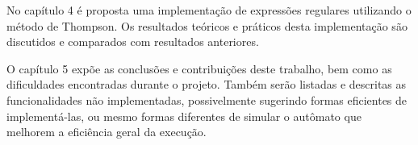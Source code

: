 \documentclass[a4paper,12pt,oneside,onecolumn]{uerj}
\begin{document}
No capítulo 4 é proposta uma implementação de expressões regulares utilizando o método de Thompson. Os resultados teóricos e práticos desta implementação são discutidos e comparados com resultados anteriores.

O capítulo 5 expõe as conclusões e contribuições deste trabalho, bem como as dificuldades encontradas durante o projeto. Também serão listadas e descritas as funcionalidades não implementadas, possivelmente sugerindo formas eficientes de implementá-las, ou mesmo formas diferentes de simular o autômato que melhorem a eficiência geral da execução.


\backmatter

\end{document}
